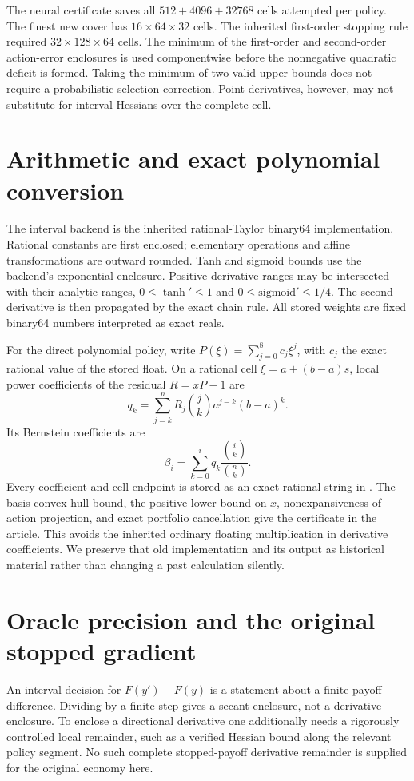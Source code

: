 The neural certificate saves all $512+4096+32768$ cells attempted per policy. The finest new cover has $16\times64\times32$ cells. The inherited first-order stopping rule required $32\times128\times64$ cells. The minimum of the first-order and second-order action-error enclosures is used componentwise before the nonnegative quadratic deficit is formed. Taking the minimum of two valid upper bounds does not require a probabilistic selection correction. Point derivatives, however, may not substitute for interval Hessians over the complete cell.

\section{Arithmetic and exact polynomial conversion}\label{supp:arithmetic}
The interval backend is the inherited rational-Taylor binary64 implementation. Rational constants are first enclosed; elementary operations and affine transformations are outward rounded. Tanh and sigmoid bounds use the backend's exponential enclosure. Positive derivative ranges may be intersected with their analytic ranges, $0\leq\tanh'\leq1$ and $0\leq\mathrm{sigmoid}'\leq1/4$. The second derivative is then propagated by the exact chain rule. All stored weights are fixed binary64 numbers interpreted as exact reals.

For the direct polynomial policy, write $P(\xi)=\sum_{j=0}^8c_j\xi^j$, with $c_j$ the exact rational value of the stored float. On a rational cell $\xi=a+(b-a)s$, local power coefficients of the residual $R=xP-1$ are
\[
 q_k=\sum_{j=k}^n R_j{j\choose k}a^{j-k}(b-a)^k.
\]
Its Bernstein coefficients are
\[
 \beta_i=\sum_{k=0}^i q_k\frac{{i\choose k}}{{n\choose k}}.
\]
Every coefficient and cell endpoint is stored as an exact rational string in . The basis convex-hull bound, the positive lower bound on $x$, nonexpansiveness of action projection, and exact portfolio cancellation give the certificate in the article. This avoids the inherited ordinary floating multiplication in derivative coefficients. We preserve that old implementation and its output as historical material rather than changing a past calculation silently.

\section{Oracle precision and the original stopped gradient}\label{supp:gradient}
An interval decision for $F(y')-F(y)$ is a statement about a finite payoff difference. Dividing by a finite step gives a secant enclosure, not a derivative enclosure. To enclose a directional derivative one additionally needs a rigorously controlled local remainder, such as a verified Hessian bound along the relevant policy segment. No such complete stopped-payoff derivative remainder is supplied for the original economy here.

